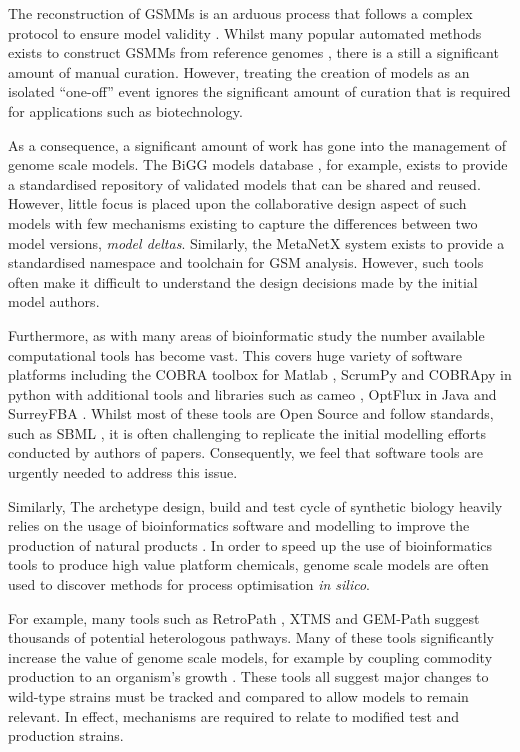 \documentclass[journal=asbcd6]{achemso}
\begin{document}
The reconstruction of GSMMs is an arduous process that follows a complex protocol to ensure model validity \cite{thiele2010protocol}.
Whilst many popular automated methods exists to construct GSMMs from reference genomes \cite{henry2010high, poolman2006scrumpy}, there is a still a significant amount of manual curation.
However, treating the creation of models as an isolated ``one-off'' event ignores the significant amount of curation that is required for applications such as biotechnology.

As a consequence, a significant amount of work has gone into the management of genome scale models.
The BiGG models database \cite{king2015bigg}, for example, exists to provide a standardised repository of validated models that can be shared and reused.
However, little focus is placed upon the collaborative design aspect of such models with few mechanisms existing to capture the differences between two model versions, \textit{model deltas}.
Similarly, the MetaNetX \cite{moretti2016metanetx} system exists to provide a standardised namespace and toolchain for GSM analysis.
However, such tools often make it difficult to understand the design decisions made by the initial model authors.

Furthermore, as with many areas of bioinformatic study the number available computational tools has become vast.
This covers huge variety of software platforms including the COBRA toolbox for Matlab \cite{schellenberger2011quantitative}, ScrumPy and COBRApy in python \cite{poolman2006scrumpy, ebrahim2013cobrapy} with additional tools and libraries such as cameo \cite{cardoso2017cameo}, OptFlux in Java \cite{rocha2010optflux} and SurreyFBA \cite{gevorgyan2010surreyfba}.
Whilst most of these tools are Open Source and follow standards, such as SBML \cite{finney2003systems}, it is often challenging to replicate the initial modelling efforts conducted by authors of papers.
Consequently, we feel that software tools are urgently needed to address this issue.

Similarly, The archetype design, build and test cycle of synthetic biology heavily relies on the usage of bioinformatics software and modelling to improve the production of natural products \cite{carbonell2016bioinformatics}.
In order to speed up the use of bioinformatics tools to produce high value platform chemicals, genome scale models are often used to discover methods for process optimisation \textit{in silico}.

For example, many tools such as RetroPath \cite{carbonell2013retropath}, XTMS \cite{carbonell2014xtms} and GEM-Path \cite{campodonico2014generation} suggest thousands of potential heterologous pathways.
Many of these tools significantly increase the value of genome scale models, for example by coupling commodity production to an organism's growth \cite{feist2010model}.
These tools all suggest major changes to wild-type strains must be tracked and compared to allow models to remain relevant.
In effect, mechanisms are required to relate to modified test and production strains.
\end{document}
